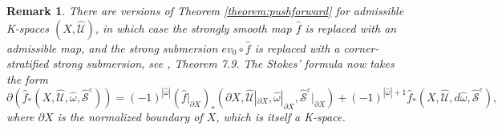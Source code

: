 \documentclass[a4paper]{article}
\newtheorem{remark}[theorem]{Remark}
\numberwithin{equation}{section}
\begin{document}
\begin{remark}\label{remark:pushforward}
There are versions of Theorem \ref{theorem:pushforward} for admissible K-spaces $(X,\widehat{\mathcal{U}})$, in which case the strongly smooth map $\hat{f}$ is replaced with an admissible map, and the strong submersion $\mathit{ev}_0\circ\hat{f}$ is replaced with a corner-stratified strong submersion, see \cite{ki2}, Theorem 7.9. The Stokes' formula now takes the form
\begin{equation}
\partial\left(\hat{f}_\ast(X,\widehat{\mathcal{U}},\hat{\omega},\widehat{\mathcal{S}}^\varepsilon)\right)=(-1)^{|\hat{\omega}|}(\hat{f}|_{\partial X})_\ast(\partial X,\widehat{\mathcal{U}}|_{\partial X},\hat{\omega}|_{\partial X},\widehat{\mathcal{S}}^\varepsilon|_{\partial X})+(-1)^{|\hat{\omega}|+1}\hat{f}_\ast(X,\widehat{\mathcal{U}},d\hat{\omega},\widehat{\mathcal{S}}^\varepsilon),
\end{equation}
where $\partial X$ is the normalized boundary of $X$, which is itself a K-space.
	

\end{remark}
\end{document}
